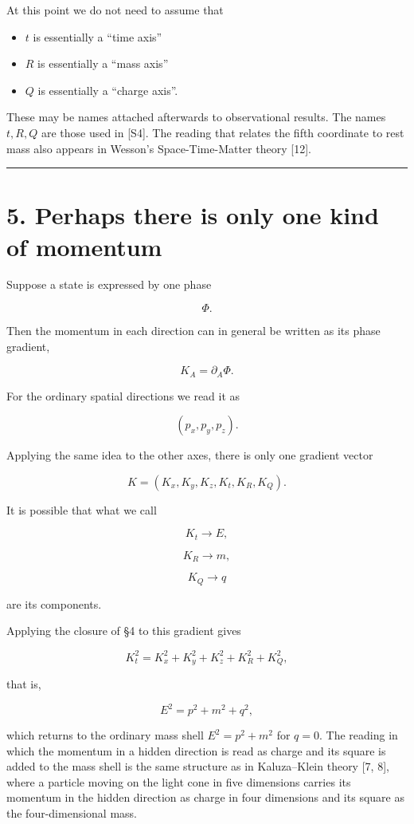 \documentclass[
  a4paper,
]{article}
\providecommand{\tightlist}{%
  \setlength{\itemsep}{0pt}\setlength{\parskip}{0pt}}
\begin{document}
At this point we do not need to assume that

\begin{itemize}
\tightlist
\item
  \(t\) is essentially a ``time axis''
\item
  \(R\) is essentially a ``mass axis''
\item
  \(Q\) is essentially a ``charge axis''.
\end{itemize}

These may be names attached afterwards to observational results. The
names \(t,R,Q\) are those used in {[}S4{]}. The reading that relates the
fifth coordinate to rest mass also appears in Wesson's Space-Time-Matter
theory {[}12{]}.

\begin{center}\rule{0.5\linewidth}{0.5pt}\end{center}

\section{5. Perhaps there is only one kind of
momentum}\label{perhaps-there-is-only-one-kind-of-momentum}

Suppose a state is expressed by one phase

\[
\Phi .
\]

Then the momentum in each direction can in general be written as its
phase gradient,

\[
K_A=\partial_A\Phi .
\]

For the ordinary spatial directions we read it as

\[
(p_x,p_y,p_z).
\]

Applying the same idea to the other axes, there is only one gradient
vector

\[
K=
(K_x,K_y,K_z,K_t,K_R,K_Q).
\]

It is possible that what we call

\[
K_t\rightarrow E,
\]

\[
K_R\rightarrow m,
\]

\[
K_Q\rightarrow q
\]

are its components.

Applying the closure of §4 to this gradient gives

\[
K_t^2=K_x^2+K_y^2+K_z^2+K_R^2+K_Q^2,
\]

that is,

\[
E^2=p^2+m^2+q^2,
\]

which returns to the ordinary mass shell \(E^2=p^2+m^2\) for \(q=0\).
The reading in which the momentum in a hidden direction is read as
charge and its square is added to the mass shell is the same structure
as in Kaluza--Klein theory {[}7, 8{]}, where a particle moving on the
light cone in five dimensions carries its momentum in the hidden
direction as charge in four dimensions and its square as the
four-dimensional mass.
\end{document}
